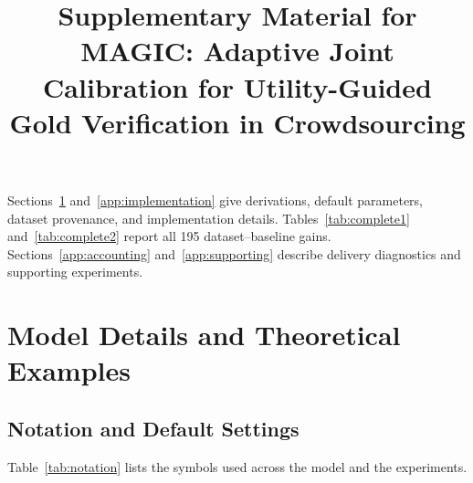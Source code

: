 \documentclass[journal]{IEEEtran}
\begin{document}
\title{Supplementary Material for MAGIC: Adaptive Joint Calibration for Utility-Guided Gold Verification in Crowdsourcing}
\author{}\date{}\maketitle
Sections~\ref{app:model} and~\ref{app:implementation} give derivations, default parameters, dataset provenance, and implementation details. Tables~\ref{tab:complete1} and~\ref{tab:complete2} report all 195 dataset--baseline gains. Sections~\ref{app:accounting} and~\ref{app:supporting} describe delivery diagnostics and supporting experiments.
\section{Model Details and Theoretical Examples}\label{app:model}
\subsection{Notation and Default Settings}

Table~\ref{tab:notation} lists the symbols used across the model and the experiments.
\end{document}
